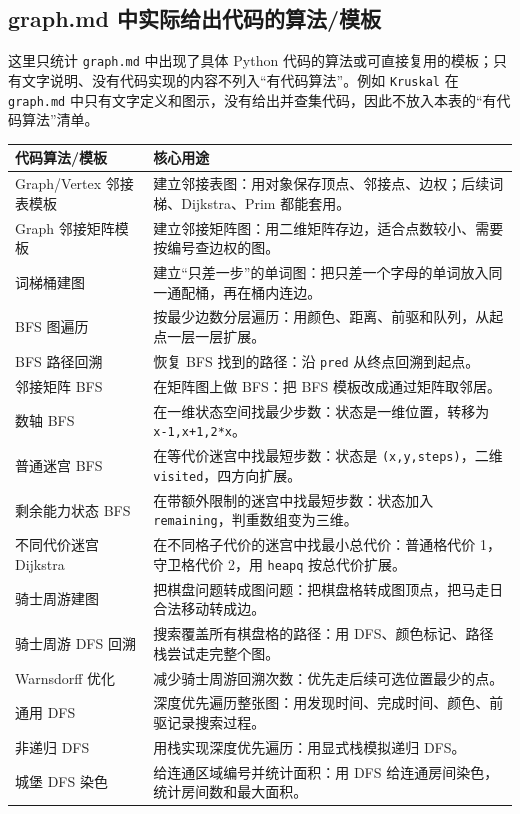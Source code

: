 \documentclass[10pt,a4paper,fontset=none]{ctexart}
\begin{document}
\subsection{graph.md 中实际给出代码的算法/模板}
这里只统计 \texttt{graph.md} 中出现了具体 Python 代码的算法或可直接复用的模板；只有文字说明、没有代码实现的内容不列入“有代码算法”。例如 \texttt{Kruskal} 在 \texttt{graph.md} 中只有文字定义和图示，没有给出并查集代码，因此不放入本表的“有代码算法”清单。

\begin{longtable}{L{4.0cm}L{11.2cm}}
\toprule
\textbf{代码算法/模板} & \textbf{核心用途} \\
\midrule
Graph/Vertex 邻接表模板 & 建立邻接表图：用对象保存顶点、邻接点、边权；后续词梯、Dijkstra、Prim 都能套用。\\
Graph 邻接矩阵模板 & 建立邻接矩阵图：用二维矩阵存边，适合点数较小、需要按编号查边权的图。\\
词梯桶建图 & 建立“只差一步”的单词图：把只差一个字母的单词放入同一通配桶，再在桶内连边。\\
BFS 图遍历 & 按最少边数分层遍历：用颜色、距离、前驱和队列，从起点一层一层扩展。\\
BFS 路径回溯 & 恢复 BFS 找到的路径：沿 \texttt{pred} 从终点回溯到起点。\\
邻接矩阵 BFS & 在矩阵图上做 BFS：把 BFS 模板改成通过矩阵取邻居。\\
数轴 BFS & 在一维状态空间找最少步数：状态是一维位置，转移为 \texttt{x-1,x+1,2*x}。\\
普通迷宫 BFS & 在等代价迷宫中找最短步数：状态是 \texttt{(x,y,steps)}，二维 \texttt{visited}，四方向扩展。\\
剩余能力状态 BFS & 在带额外限制的迷宫中找最短步数：状态加入 \texttt{remaining}，判重数组变为三维。\\
不同代价迷宫 Dijkstra & 在不同格子代价的迷宫中找最小总代价：普通格代价 1，守卫格代价 2，用 \texttt{heapq} 按总代价扩展。\\
骑士周游建图 & 把棋盘问题转成图问题：把棋盘格转成图顶点，把马走日合法移动转成边。\\
骑士周游 DFS 回溯 & 搜索覆盖所有棋盘格的路径：用 DFS、颜色标记、路径栈尝试走完整个图。\\
Warnsdorff 优化 & 减少骑士周游回溯次数：优先走后续可选位置最少的点。\\
通用 DFS & 深度优先遍历整张图：用发现时间、完成时间、颜色、前驱记录搜索过程。\\
非递归 DFS & 用栈实现深度优先遍历：用显式栈模拟递归 DFS。\\
城堡 DFS 染色 & 给连通区域编号并统计面积：用 DFS 给连通房间染色，统计房间数和最大面积。\\

\end{longtable}
\end{document}
